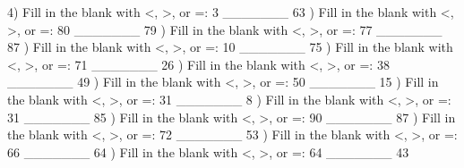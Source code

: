 \documentclass{article}%
\begin{document}
4) Fill in the blank with <, >, or =: 3 \_\_\_\_\_\_\_ 63%
\newline%
\newline%
) Fill in the blank with <, >, or =: 80 \_\_\_\_\_\_\_ 79%
\newline%
\newline%
) Fill in the blank with <, >, or =: 77 \_\_\_\_\_\_\_ 87%
\newline%
\newline%
) Fill in the blank with <, >, or =: 10 \_\_\_\_\_\_\_ 75%
\newline%
\newline%
) Fill in the blank with <, >, or =: 71 \_\_\_\_\_\_\_ 26%
\newline%
\newline%
) Fill in the blank with <, >, or =: 38 \_\_\_\_\_\_\_ 49%
\newline%
\newline%
) Fill in the blank with <, >, or =: 50 \_\_\_\_\_\_\_ 15%
\newline%
\newline%
) Fill in the blank with <, >, or =: 31 \_\_\_\_\_\_\_ 8%
\newline%
\newline%
) Fill in the blank with <, >, or =: 31 \_\_\_\_\_\_\_ 85%
\newline%
\newline%
) Fill in the blank with <, >, or =: 90 \_\_\_\_\_\_\_ 87%
\newline%
\newline%
) Fill in the blank with <, >, or =: 72 \_\_\_\_\_\_\_ 53%
\newline%
\newline%
) Fill in the blank with <, >, or =: 66 \_\_\_\_\_\_\_ 64%
\newline%
\newline%
) Fill in the blank with <, >, or =: 64 \_\_\_\_\_\_\_ 43%
\newline%
\end{document}
